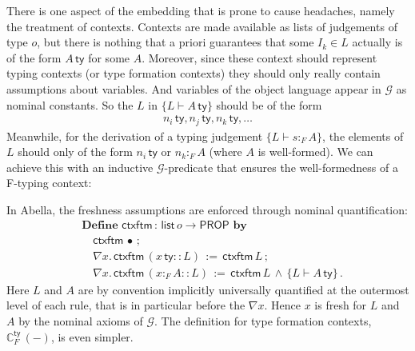 \documentclass[a4paper,UKenglish]{lipics-v2016}
\newcommand{\ms}{\,}
\newcommand{\mrel}[1]{\mathrel{\ms #1 \ms}}
\newcommand{\Prop}{\ensuremath{\mathsf{PROP}}}
\newcommand{\OF}{\mrel{:}}
\newcommand{\mAnd}{\mrel{\wedge}}
\newcommand{\eqdef}{\mrel{:=}}
\newcommand{\ty}{\mathsf{ty}}
\newcommand{\tm}{\mathsf{tm}}
\newcommand{\istyFh}[1]{\ensuremath{#1\ms\mathsf{ty}}}
\newcommand{\typingFh}[2]{\ensuremath{#1 \mathbin{:_{F}} #2}}
\newcommand{\emptyctx}{\ensuremath{\bullet}}
\begin{document}
There is one aspect of the embedding that is prone to cause headaches, namely the treatment of contexts.
Contexts are made available as lists of judgements of type $o$, but there is nothing that a priori guarantees that some $I_k \in L$ actually is of the form $\istyFh A$ for some $A$.
Moreover, since these context should represent typing contexts (or type formation contexts) they should only really contain assumptions about variables.
And variables of the object language appear in $\mathcal{G}$ as nominal constants.
So the $L$ in $\{L \vdash \istyFh{A}\}$ should be of the form
\begin{align*}
  \istyFh{n_i}, \istyFh{n_j}, \istyFh{n_k}, \ldots
\end{align*}
Meanwhile, for the derivation of a typing judgement $\{L \vdash \typingFh{s}{A}\}$, the elements of $L$ should only of the form $\istyFh{n_i}$ or $\typingFh{n_k}{A}$ (where $A$ is well-formed).
We can achieve this with an inductive $\mathcal{G}$-predicate that ensures the well-formedness of a F-typing context:
\newcommand{\ac}[3]{\ensuremath{\mathbb{C}_{#1}^{#2}\ms (#3)}}
\newcommand{\acFty}[1]{\ac{F}{\ty}{#1}}
\newcommand{\acFtm}[1]{\ac{F}{\tm}{#1}}
In Abella, the freshness assumptions are enforced through nominal quantification:
\begin{align*}
  &\mathbf{Define}\ms\ms\mathsf{ctxftm} \OF \mathsf{list}\,o \to \Prop \ms\ms\mathbf{by}\\
  &\quad\mathsf{ctxftm}\ms\emptyctx\ms;\\
  &\quad\nabla x. \ms \mathsf{ctxftm}\ms (\istyFh{x} \mathbin{::} L) \eqdef \mathsf{ctxftm}\ms L \ms;\\
  &\quad\nabla x. \ms \mathsf{ctxftm}\ms (\typingFh{x}{A} \mathbin{::} L) \eqdef \mathsf{ctxftm}\ms L \mAnd \{L \vdash \istyFh{A}\}\ms.
\end{align*}
Here $L$ and $A$ are by convention implicitly universally quantified at the outermost level of each rule, that is in particular before the $\nabla x$.
Hence $x$ is fresh for $L$ and $A$ by the nominal axioms of $\mathcal{G}$.
The definition for type formation contexts, \acFty{-}, is even simpler.
\end{document}
